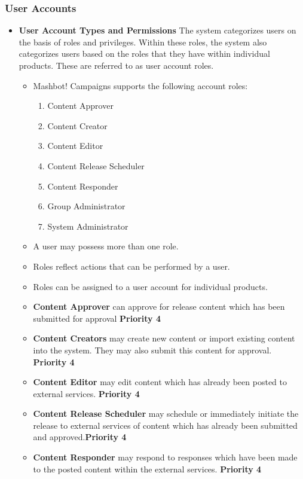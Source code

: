 \documentclass{article}
\begin{document}
		\subsubsection{User Accounts} %
			\begin{itemize}
				\item \textbf{User Account Types and Permissions} The system categorizes users on the basis
				of roles and privileges. Within these roles, the system also categorizes users based on
			 	the roles that they have within individual products.	These are referred to as user 
				account roles.
				\begin{itemize}
					\item Mashbot! Campaigns supports the following account roles:
						\begin{enumerate}
							\item Content Approver
							\item Content Creator
							\item Content Editor
							\item Content Release Scheduler
							\item Content Responder
							\item Group Administrator
							\item System Administrator
						\end{enumerate}
					\item A user may possess more than one role.
					\item Roles reflect actions that can be performed by a user.
					\item Roles can be assigned to a user account for individual products.
					\item \textbf{Content Approver} can approve for release content which has been
					submitted for approval \textbf{Priority 4}
					\item \textbf{Content Creators} may create new content or 
					import existing content into the system. They may also 
					submit this content for approval. \textbf{Priority 4}
					\item \textbf{Content Editor} may edit content which has already been posted to external
					services. \textbf{Priority 4} 
					\item \textbf{Content Release Scheduler} may schedule or 
					immediately initiate the release to external services of 
					content which has already been submitted and 
					approved.\textbf{Priority 4}  
					\item \textbf{Content Responder} may respond to responses 
					which have been made to the posted content within the 
					external services.  \textbf{Priority 4} 
					

\end{itemize}
\end{itemize}
\end{document}
